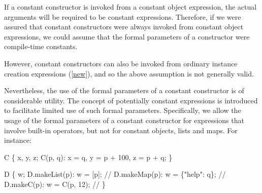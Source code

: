\documentclass[makeidx]{article}
\begin{document}
{{  If a constant constructor is invoked from a constant object expression,
  the actual arguments will be required to be constant expressions.
  Therefore, if we were assured that
  constant constructors were always invoked from constant object expressions,
  we could assume that the formal parameters of a constructor were
  compile-time constants.

  However, constant constructors can also be invoked from
  ordinary instance creation expressions (\ref{new}),
  and so the above assumption is not generally valid.

  Nevertheless, the use of the formal parameters of a constant constructor
  is of considerable utility.
  The concept of potentially constant expressions is introduced to facilitate
  limited use of such formal parameters.
  Specifically, we allow the usage of
  the formal parameters of a constant constructor
  for expressions that involve built-in operators,
  but not for constant objects, lists and maps.
  For instance:%
}

\begin{dartCode}
\CLASS{} C \{
  \FINAL{} x, y, z;
  \CONST{} C(p, q): x = q, y = p + 100, z = p + q;
\}
\end{dartCode}


\begin{dartCode}
\CLASS{} D \{
  \FINAL{} w;
  \CONST{} D.makeList(p): w = \CONST{} [p]; // 
  \CONST{} D.makeMap(p): w = \CONST{} \{"help": q\}; // 
  \CONST{} D.makeC(p): w = \CONST{} C(p, 12); // 
\}
\end{dartCode}


}
\end{document}
